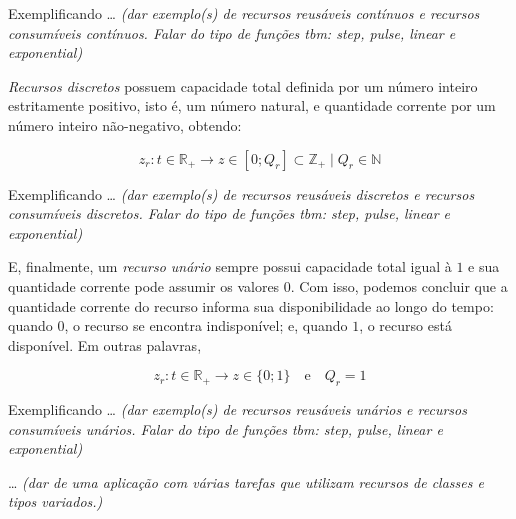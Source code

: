         Exemplificando \dots \emph{\color{red} (dar exemplo(s) de recursos reusáveis contínuos e recursos consumíveis contínuos. Falar do tipo de funções tbm: \textit{step}, \textit{pulse}, \textit{linear} e \textit{exponential})}
        
        \textit{Recursos discretos} possuem capacidade total definida por um número inteiro estritamente positivo, isto é, um número natural, e quantidade corrente por um número inteiro não-negativo, obtendo:
        
        \begin{equation} \label{eq:recurso_discreto}
            z_r: t \in \mathbb{R}_+ \to z \in [0; Q_r] \subset \mathbb{Z}_+ \mid Q_r \in \mathbb{N}
        \end{equation}
        
        Exemplificando \dots \emph{\color{red} (dar exemplo(s) de recursos reusáveis discretos e recursos consumíveis discretos. Falar do tipo de funções tbm: \textit{step}, \textit{pulse}, \textit{linear} e \textit{exponential})}
        
        E, finalmente, um \textit{recurso unário} sempre possui capacidade total igual à $1$ e sua quantidade corrente pode assumir os valores $0$. Com isso, podemos concluir que a quantidade corrente do recurso informa sua disponibilidade ao longo do tempo: quando $0$, o recurso se encontra indisponível; e, quando $1$, o recurso está disponível. Em outras palavras,
        
        \begin{equation} \label{eq:recurso_unario}
            z_r: t \in \mathbb{R}_+ \to z \in \{0; 1\} 
            \quad\text{e}\quad
            Q_r = 1
        \end{equation}
        
        Exemplificando \dots \emph{\color{red} (dar exemplo(s) de recursos reusáveis unários e recursos consumíveis unários. Falar do tipo de funções tbm: \textit{step}, \textit{pulse}, \textit{linear} e \textit{exponential})}
        
        \dots \emph{\color{red} (dar de uma aplicação com várias tarefas que utilizam recursos de classes e tipos variados.)}
